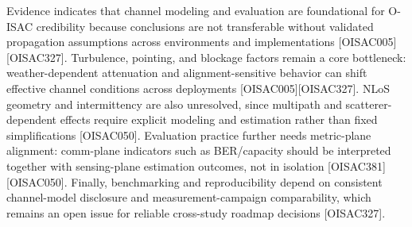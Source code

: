 {}Evidence indicates that channel modeling and evaluation are foundational for O-ISAC credibility because conclusions are not transferable without validated propagation assumptions across environments and implementations [O\markdownRendererUnderscore{}ISAC\markdownRendererUnderscore{}005][O\markdownRendererUnderscore{}ISAC\markdownRendererUnderscore{}327]. Turbulence, pointing, and blockage factors remain a core bottleneck: weather-dependent attenuation and alignment-sensitive behavior can shift effective channel conditions across deployments [O\markdownRendererUnderscore{}ISAC\markdownRendererUnderscore{}005][O\markdownRendererUnderscore{}ISAC\markdownRendererUnderscore{}327]. NLoS geometry and intermittency are also unresolved, since multipath and scatterer-dependent effects require explicit modeling and estimation rather than fixed simplifications [O\markdownRendererUnderscore{}ISAC\markdownRendererUnderscore{}050]. Evaluation practice further needs metric-plane alignment: comm-plane indicators such as BER/capacity should be interpreted together with sensing-plane estimation outcomes, not in isolation [O\markdownRendererUnderscore{}ISAC\markdownRendererUnderscore{}381][O\markdownRendererUnderscore{}ISAC\markdownRendererUnderscore{}050]. Finally, benchmarking and reproducibility depend on consistent channel-model disclosure and measurement-campaign comparability, which remains an open issue for reliable cross-study roadmap decisions [O\markdownRendererUnderscore{}ISAC\markdownRendererUnderscore{}327].\markdownRendererInterblockSeparator
{}
\markdownRendererSectionEnd \markdownRendererSectionBegin
{}\markdownRendererInterblockSeparator
